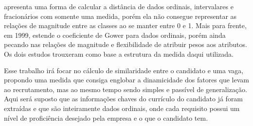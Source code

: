 \documentclass[preprint,12pt]{elsarticle}
\begin{document}
\cite{analysis-cluster} apresenta uma forma de calcular a distância de dados ordinais, intervalares e fracionários com somente uma medida, porém ela não consegue representar as relações de magnitude entre as classes ao se manter entre 0 e 1. Mais para frente, em 1999, \cite{analysis-cluster} estende o coeficiente de Gower para dados ordinais, porém ainda pecando nas relações de magnitude e flexibilidade de atribuir pesos aos atributos. Os dois estudos trouxeram como base a estrutura da medida daqui utilizada.

Esse trabalho irá focar no cálculo de similaridade entre o candidato e uma vaga, propondo uma medida que consiga englobar a dinamicidade dos fatores que levam ao recrutamento, mas ao mesmo tempo sendo simples e passível de generalização. Aqui será suposto que as informações chaves do currículo do candidato já foram extraídas e que são inteiramente dados ordinais, onde cada requisito possui um nível de proficiência desejado pela empresa e o que o candidato tem. 



\end{document}
